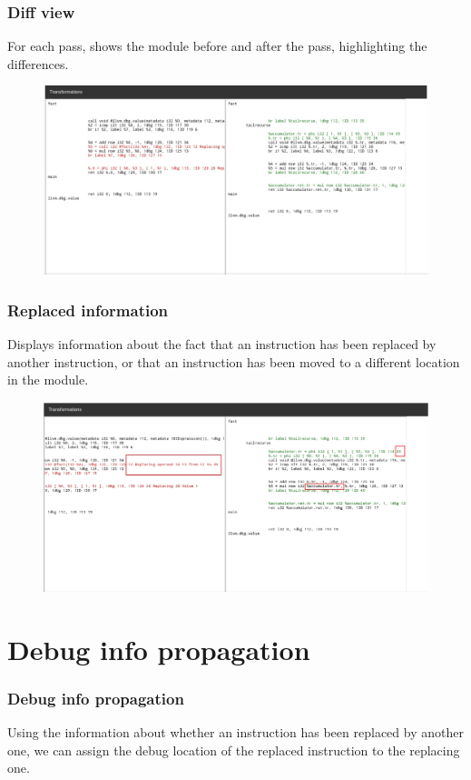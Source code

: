 \documentclass{beamer}
\begin{document}
\begin{frame}
\frametitle{Diff view}
For each pass, shows the module before and after the pass, highlighting the differences. \newline
\begin{figure}[b]
\includegraphics[scale=0.25]{ba.jpg}
\end{figure}
\end{frame}

\begin{frame}
\frametitle{Replaced information}
Displays information about the fact that an instruction has been replaced by another instruction, or that an instruction has been moved to a different location in the module.\newline
\begin{figure}[b]
\includegraphics[scale=0.25]{rep.jpg}
\end{figure}
\end{frame}

\section{Debug info propagation}
\begin{frame}
\frametitle{Debug info propagation}
Using the information about whether an instruction has been replaced by another one, we can assign the debug location of the replaced instruction to the replacing one. \newline
\end{frame}
\end{document}
